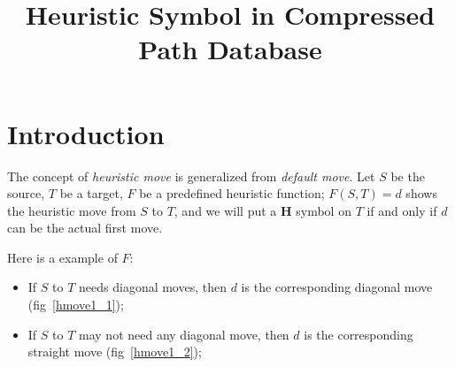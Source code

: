 \documentclass{article}
\begin{document}
\title{Heuristic Symbol in Compressed Path Database}
\maketitle 

\section{Introduction}
The concept of \textit{heuristic move} is generalized from \textit{default move}.
Let $S$ be the source, $T$ be a target, $F$ be a predefined heuristic function;
$F(S, T)=d$ shows the heuristic move from $S$ to $T$,
and we will put a \textbf{H} symbol on $T$ if and only if $d$ can be the actual first move. 

Here is a example of $F$:
\begin{itemize}
  \item If $S$ to $T$ needs diagonal moves, then $d$ is the corresponding diagonal move (fig~\ref{hmove1_1});

  \item If $S$ to $T$ may not need any diagonal move, then $d$ is the corresponding straight move (fig~\ref{hmove1_2});


\end{itemize}
\end{document}
